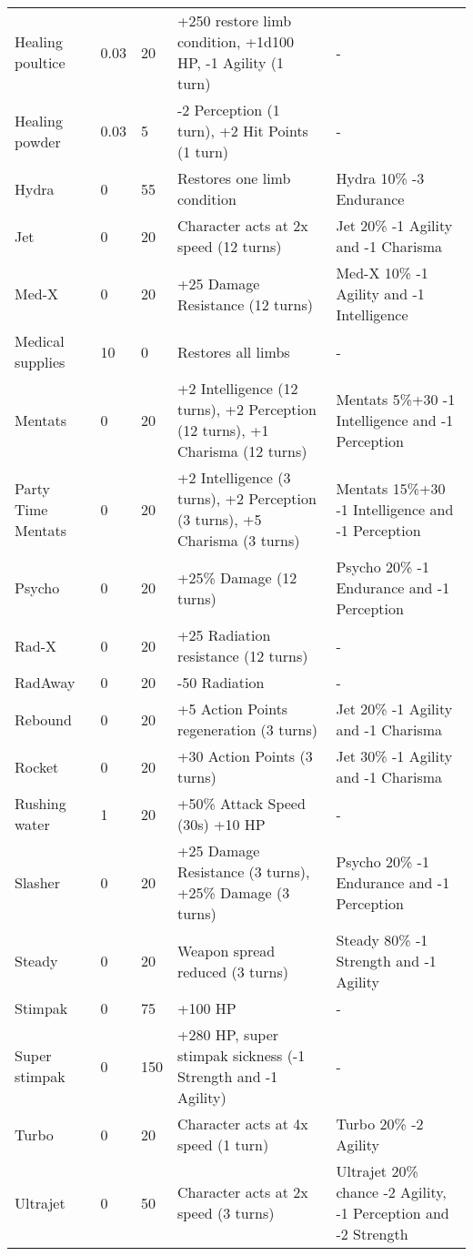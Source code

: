 \begin{longtable}{|p{4cm}|p{1.2cm}|p{1.2cm}|p{4cm}|p{4cm}|}
Healing poultice  & 0.03  & 20 & +250 restore limb condition, +1d100 HP, -1 Agility (1 turn)  & - \\
Healing powder  & 0.03  & 5 & -2 Perception (1 turn), +2 Hit Points (1 turn)  & - \\
Hydra  & 0 & 55 & Restores one limb condition & Hydra  10\% -3 Endurance  \\
Jet  & 0 & 20 & Character acts at 2x speed (12 turns)  & Jet  20\% -1 Agility and -1 Charisma  \\
Med-X  & 0 & 20 & +25 Damage Resistance (12 turns)  & Med-X  10\% -1 Agility and -1 Intelligence  \\
Medical supplies  & 10 & 0 & Restores all limbs  & - \\
Mentats  & 0 & 20 & +2 Intelligence (12 turns), +2 Perception (12 turns), +1 Charisma (12 turns)  & Mentats  5\%+30 -1 Intelligence and -1 Perception  \\
Party Time Mentats  & 0 & 20 & +2 Intelligence (3 turns), +2 Perception (3 turns), +5 Charisma (3 turns)  & Mentats  15\%+30 -1 Intelligence and -1 Perception  \\
Psycho  & 0 & 20 & +25\% Damage (12 turns)  & Psycho  20\% -1 Endurance and -1 Perception  \\
Rad-X  & 0 & 20 & +25 Radiation resistance (12 turns)  & - \\
RadAway  & 0 & 20 & -50 Radiation  & - \\
Rebound  & 0 & 20 & +5 Action Points regeneration (3 turns)  & Jet  20\% -1 Agility and -1 Charisma  \\
Rocket  & 0 & 20 & +30 Action Points (3 turns)  & Jet  30\% -1 Agility and -1 Charisma  \\
Rushing water  & 1 & 20 & +50\% Attack Speed (30s) +10 HP  & - \\
Slasher  & 0 & 20 & +25 Damage Resistance (3 turns), +25\% Damage (3 turns)  & Psycho  20\% -1 Endurance and -1 Perception  \\
Steady  & 0 & 20 & Weapon spread reduced (3 turns)  & Steady  80\% -1 Strength and -1 Agility  \\
Stimpak  & 0 & 75 & +100 HP & - \\
Super stimpak  & 0 & 150 & +280 HP, super stimpak sickness (-1 Strength and -1 Agility) & - \\
Turbo  & 0 & 20 & Character acts at 4x speed (1 turn)  & Turbo  20\% -2 Agility  \\
Ultrajet  & 0 & 50 & Character acts at 2x speed (3 turns)  & Ultrajet  20\% chance -2 Agility, -1 Perception and -2 Strength  \\
\hline
\end{longtable}
